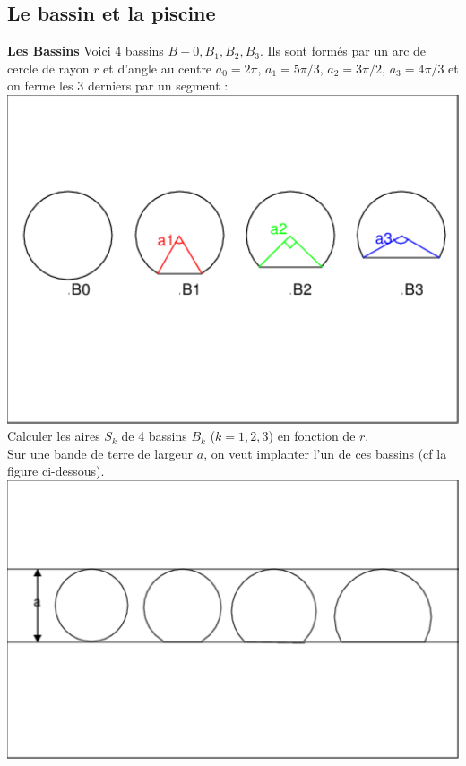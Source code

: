 \documentclass[a4paper,11pt]{book}
\begin{document}
\subsection{Le bassin et la piscine}
{\bf Les Bassins}
Voici 4  bassins $B-0,B_1,B_2,B_3$. Ils sont form\'es par un arc de cercle de 
rayon $r$ et d'angle au centre $a_0=2\pi$, $a_1=5\pi/3$, $a_2=3\pi/2$, 
$a_3=4\pi/3$ et on ferme les 3 derniers  par un segment :\\
\includegraphics[width=\textwidth]{bassin}\\
Calculer les aires $S_k$ de 4 bassins $B_k$ ($k=1,2,3$) en fonction de $r$.\\
Sur une bande de terre de largeur $a$, on veut implanter l'un de ces bassins
(cf la figure ci-dessous).\\
\includegraphics[width=\textwidth]{bassin1}\\
\end{document}
